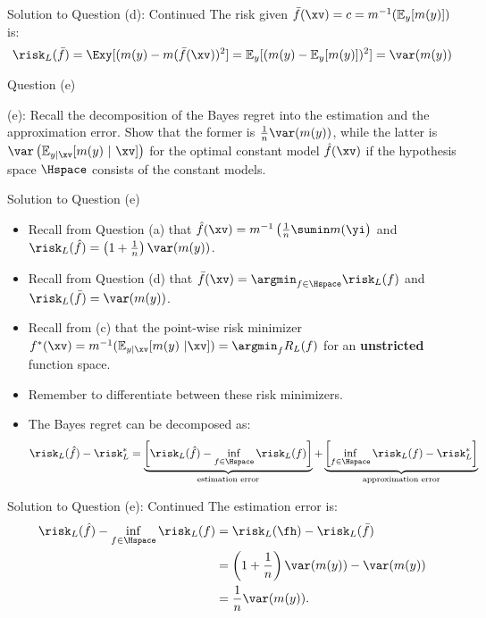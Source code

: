\documentclass[aspectratio=169]{beamer}
\newcommand{\Eyx}{\mathbb{E}_{y|\xv}}
\newcommand{\my}{m(y)}
\begin{document}
\begin{frame}{Solution to Question (d): Continued}
	The risk given $\bar{f}(\xv) = c = m^{-1}(\mathbb{E}_y[\my])$ is:
	$$\risk_{L}(\bar{f}) = \Exy[(\my - m(\bar{f}(\xv))^2] = \mathbb{E}_y[(\my - \mathbb{E}_y[\my])^2] = \var(\my) $$
\end{frame}

\begin{frame}{Question (e)}

	(e): Recall the decomposition of the Bayes regret into the estimation and the approximation error. Show that the former is $\frac{1}{n}\var(\my)$, while the latter is $\var\left(\Eyx[\my \ | \ \xv] \right)$ for the optimal constant model $\hat{f}(\xv)$ if the hypothesis space $\Hspace$ consists of the constant models.

\end{frame}

\begin{frame}{Solution to Question (e)}
	\begin{itemize}
			\item Recall from Question (a) that $\hat{f}(\xv) = m^{-1}\left(\frac{1}{n} \sumin m(\yi\right)$ and $\risk_L(\hat{f}) = \left( 1 + \frac{1}{n} \right) \var(\my)$.
			\item Recall from Question (d) that $\bar{f}(\xv) = \argmin_{f \in \Hspace} \risk_L(f)$ and $\risk_L(\bar{f}) = \var(\my)$.
			\item Recall from (c) that the point-wise risk minimizer $f^*(\xv) = m^{-1}(\Eyx[\my \ | \xv]) = \argmin_{f} R_L(f)$ for an \textbf{unstricted} function space.
			\item Remember to differentiate between these risk minimizers.
			\item The Bayes regret can be decomposed as:
				$$\risk_L(\hat{f}) - \risk_L^* = \underbrace{\left[ \risk_L(\hat{f}) - \inf_{f \in \Hspace} \risk_L(f) \right]}_{\text{estimation error}} + \underbrace{\left[ \inf_{f \in \Hspace} \risk_L(f) - \risk_L^* \right]}_{\text{approximation error}}$$
		\end{itemize}
\end{frame}


\begin{frame}{Solution to Question (e): Continued}
The estimation error is:
	\begin{align*}
		\risk_L(\hat{f}) - \inf_{f \in \Hspace} \risk_L(f) 
		&= \risk_{L} (\fh) - \risk_L(\bar{f}) \\
		&= \left(1 + \frac{1}{n}\right) \var(\my) - \var(\my) \\
		&= \frac{1}{n} \var(\my).
	\end{align*}
\end{frame}
\end{document}
